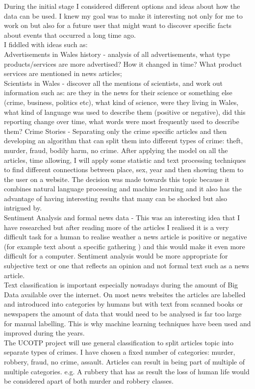 \documentclass[a4paper, 12pt]{report}
\begin{document}
During the initial stage I considered different options and ideas about how the data can be used. I knew my goal was to make it interesting not only for me to work on but also for a future user that might want to discover specific facts about events that occurred a long time ago.\\
I fiddled with ideas such as:  \\
Advertisements in Wales history - analysis of all advertisements, what type products/services are more advertised? How it changed in time? What product services are mentioned in news articles;\\
Scientists in Wales - discover all the mentions of scientists, and work out information such as: are they in the news for their science or  something else (crime, business, politics etc), what kind of science, were they living in Wales, what kind of language was used to describe  them (positive or negative), did this reporting change over time, what words were most frequently used to describe them? 
Crime Stories - Separating only the crime specific articles and then developing an algorithm that can split them into different types of crime: theft, murder, fraud, bodily harm, no crime.  After applying the model on all the articles, time allowing, I will apply some statistic and text processing techniques to find different connections between place, sex, year and then showing them to the user on a website. The decision was made towards this topic because it combines natural language processing and machine learning and it also has the advantage of having interesting results that many can be shocked but also intrigued by.\\

Sentiment Analysis and formal news data - This was an interesting idea that I have researched but after reading more of the articles I realised it is a very difficult task for a human to realise weather a news article is positive or negative (for example text about a specific gathering ) and this would make it even more difficult for a computer. Sentiment analysis would be more appropriate for subjective text or one that reflects an opinion and not formal text such as a news article.\\
Text classification is important especially nowadays during the amount of Big Data available over the internet. On most news websites the articles are labelled and introduced into categories by humans but with text from scanned books or newspapers the amount of data that would need to be analysed is far too large for manual labelling. This is why machine learning techniques have been used and improved during the years. \\
The UCOTP project will use general classification to split articles topic into separate types of crimes. I have chosen a fixed number of categories: murder, robbery, fraud, no crime, assault. Articles can result in being part of multiple of multiple categories. e.g. A rubbery that has as result the loss of human life would be considered apart of both murder and robbery classes.\\
\end{document}
